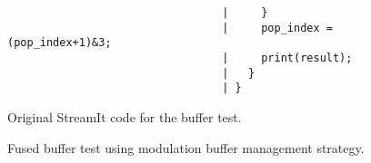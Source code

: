 \begin{figure}[t]
\begin{minipage}{3in}
{\begin{verbatim}
                                 |     }                                         
                                 |     pop_index = (pop_index+1)&3;         
                                 |     print(result);              
                                 |   }                                              
                                 | }
\end{verbatim}}
\end{minipage}
\begin{minipage}{1.5in}
\vspace{-6pt}
\caption{Original StreamIt code for the buffer test.\protect\label{fig:code-orig}}
\end{minipage}
\hspace{0.3in}
\begin{minipage}{1.5in}
\vspace{-6pt}
\caption{Fused buffer test using modulation buffer management strategy.\protect\label{fig:code-modulation}}
\end{minipage}
\vspace{-12pt}
\end{figure}

